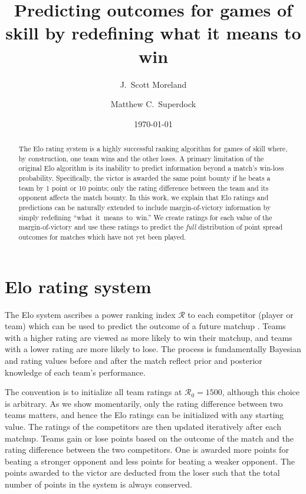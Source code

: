 \documentclass[aps,prc,reprint,amsmath,superscriptaddress,nofootinbib]{revtex4-1}
\newcommand{\R}{\mathcal{R}}
\begin{document}
\title{Predicting outcomes for games of skill by redefining what it means to win}

\author{J.\ Scott Moreland}
\author{Matthew C.\ Superdock}

\date{\today}


\begin{abstract}
The Elo rating system is a highly successful ranking algorithm for games of skill where, by construction, one team wins and the other loses.
A primary limitation of the original Elo algorithm is its inability to predict information beyond a match's win-loss probability.
Specifically, the victor is awarded the same point bounty if he beats a team by 1 point or 10 points; only the rating difference between the team and its opponent affects the match bounty.
  In this work, we explain that Elo ratings and predictions can be naturally extended to include margin-of-victory information by simply redefining \mbox{``what it means to win.''}
We create ratings for each value of the margin-of-victory and use these ratings to predict the \emph{full} distribution of point spread outcomes for matches which have not yet been played.
\end{abstract}


\maketitle

\section{Elo rating system}

The Elo system ascribes a power ranking index $\R$ to each competitor (player or team) which can be used to predict the outcome of a future matchup \cite{elo1978rating}.
Teams with a higher rating are viewed as more likely to win their matchup, and teams with a lower rating are more likely to lose.
The process is fundamentally Bayesian and rating values before and after the match reflect prior and posterior knowledge of each team's performance.

The convention is to initialize all team ratings at ${\R_0 = 1500}$, although this choice is arbitrary.
As we show momentarily, only the rating difference between two teams matters, and hence the Elo ratings can be initialized with any starting value.
The ratings of the competitors are then updated iteratively after each matchup.
Teams gain or lose points based on the outcome of the match and the rating difference between the two competitors.
One is awarded more points for beating a stronger opponent and less points for beating a weaker opponent.
The points awarded to the victor are deducted from the loser such that the total number of points in the system is always conserved.
\end{document}
